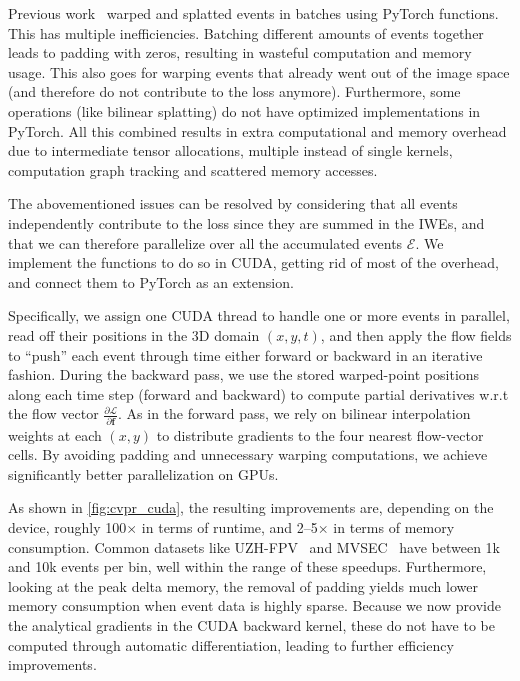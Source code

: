 Previous work~\cite{paredes-valles2023taming} warped and splatted events in batches using PyTorch functions. This has multiple inefficiencies. Batching different amounts of events together leads to padding with zeros, resulting in wasteful computation and memory usage. This also goes for warping events that already went out of the image space (and therefore do not contribute to the loss anymore). Furthermore, some operations (like bilinear splatting) do not have optimized implementations in PyTorch. All this combined results in extra computational and memory overhead due to intermediate tensor allocations, multiple instead of single kernels, computation graph tracking and scattered memory accesses.

The abovementioned issues can be resolved by considering that all events independently contribute to the loss since they are summed in the IWEs, and that we can therefore parallelize over all the accumulated events $\mathcal{E}$. We implement the functions to do so in CUDA, getting rid of most of the overhead, and connect them to PyTorch as an extension. 

Specifically, we assign one CUDA thread to handle one or more events in parallel, read off their positions in the 3D domain $(x,y,t)$, and then apply the flow fields to ``push'' each event through time either forward or backward in an iterative fashion. During the backward pass, we use the stored warped-point positions along each time step (forward and backward) to compute partial derivatives w.r.t the flow vector $\frac{\partial \mathcal{L}}{\partial \mathbf{f}}$. As in the forward pass, we rely on bilinear interpolation weights at each $(x,y)$ to distribute gradients to the four nearest flow-vector cells. By avoiding padding and unnecessary warping computations, we achieve significantly better parallelization on GPUs.

As shown in \cref{fig:cvpr_cuda}, the resulting improvements are, depending on the device, roughly 100$\times$ in terms of runtime, and 2--5$\times$ in terms of memory consumption. Common datasets like UZH-FPV~\cite{delmerico2019are} and MVSEC~\cite{zhu2018multivehicle} have between 1k and 10k events per bin, well within the range of these speedups. Furthermore, looking at the peak delta memory, the removal of padding yields much lower memory consumption when event data is highly sparse. Because we now provide the analytical gradients in the CUDA backward kernel, these do not have to be computed through automatic differentiation, leading to further efficiency improvements.

